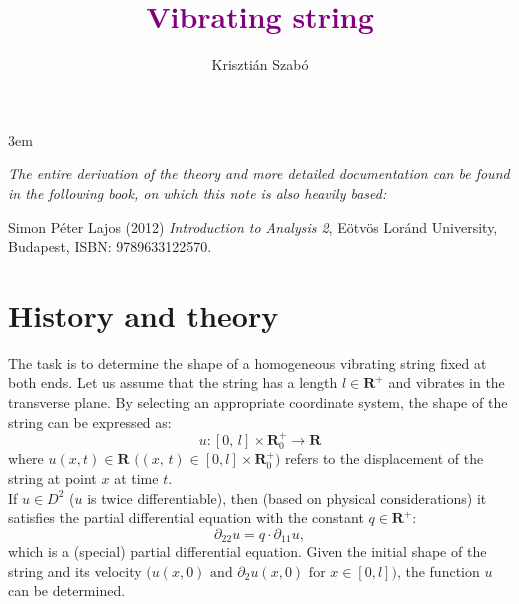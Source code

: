 \documentclass[12pt]{article}
\title{\textcolor{purple}{\Huge\textbf{Vibrating string}}}
\author{Krisztián Szabó}
\begin{document}
	\emergencystretch 3em
	\maketitle
	\begin{center}
		\textit{The entire derivation of the theory and more detailed documentation can be found in the following book, on which this note is also heavily based:}
	\end{center}
	
\begin{thebibliography}{9}
	Simon Péter Lajos (2012) \emph{Introduction to Analysis 2}, Eötvös Loránd University, Budapest, ISBN: 9789633122570.
\end{thebibliography}

\section{History and theory}

The task is to determine the shape of a homogeneous vibrating string fixed at both ends. Let us assume that the string has a length $l \in \mathbf{R}^+$ and vibrates in the transverse plane. By selecting an appropriate coordinate system, the shape of the string can be expressed as:
$$
u : [0, \, l] \times \mathbf{R}_0^+ \to \mathbf{R}
$$
where $u(x, t) \in \mathbf{R} \, \, \big((x, \, t) \in [0, l] \times \mathbf{R}_0^+\big)$ refers to the displacement of the string at point $x$ at time $t$.\\

If $u \in D^2$ ($u$ is twice differentiable), then (based on physical considerations) it satisfies the partial differential equation with the constant $q \in \mathbf{R}^+$:
$$
\partial_{22} u = q \cdot \partial_{11} u,
$$
which is a (special) partial differential equation. Given the initial shape of the string and its velocity $\big(u(x, 0) \text{ and } \partial_2 u(x, 0) \text{ for }  x \in [0, l] \big)$, the function $u$ can be determined.\\
\end{document}
